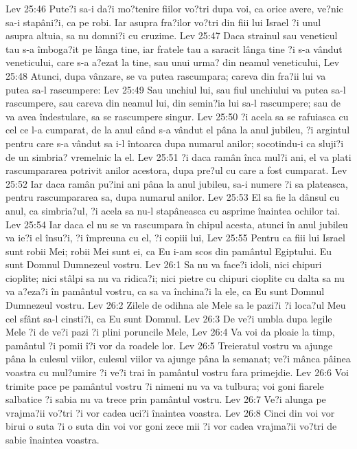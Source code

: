 Lev 25:46  Pute?i sa-i da?i mo?tenire fiilor vo?tri dupa voi, ca orice avere, ve?nic sa-i stapâni?i, ca pe robi. Iar asupra fra?ilor vo?tri din fiii lui Israel ?i unul asupra altuia, sa nu domni?i cu cruzime.
Lev 25:47  Daca strainul sau veneticul tau s-a îmboga?it pe lânga tine, iar fratele tau a saracit lânga tine ?i s-a vândut veneticului, care s-a a?ezat la tine, sau unui urma? din neamul veneticului,
Lev 25:48  Atunci, dupa vânzare, se va putea rascumpara; careva din fra?ii lui va putea sa-l rascumpere:
Lev 25:49  Sau unchiul lui, sau fiul unchiului va putea sa-l rascumpere, sau careva din neamul lui, din semin?ia lui sa-l rascumpere; sau de va avea îndestulare, sa se rascumpere singur.
Lev 25:50  ?i acela sa se rafuiasca cu cel ce l-a cumparat, de la anul când s-a vândut el pâna la anul jubileu, ?i argintul pentru care s-a vândut sa i-l întoarca dupa numarul anilor; socotindu-i ca sluji?i de un simbria? vremelnic la el.
Lev 25:51  ?i daca ramân înca mul?i ani, el va plati rascumpararea potrivit anilor acestora, dupa pre?ul cu care a fost cumparat.
Lev 25:52  Iar daca ramân pu?ini ani pâna la anul jubileu, sa-i numere ?i sa plateasca, pentru rascumpararea sa, dupa numarul anilor.
Lev 25:53  El sa fie la dânsul cu anul, ca simbria?ul, ?i acela sa nu-l stapâneasca cu asprime înaintea ochilor tai.
Lev 25:54  Iar daca el nu se va rascumpara în chipul acesta, atunci în anul jubileu va ie?i el însu?i, ?i împreuna cu el, ?i copiii lui,
Lev 25:55  Pentru ca fiii lui Israel sunt robii Mei; robii Mei sunt ei, ca Eu i-am scos din pamântul Egiptului. Eu sunt Domnul Dumnezeul vostru.
Lev 26:1  Sa nu va face?i idoli, nici chipuri cioplite; nici stâlpi sa nu va ridica?i; nici pietre cu chipuri cioplite cu dalta sa nu va a?eza?i în pamântul vostru, ca sa va închina?i la ele, ca Eu sunt Domnul Dumnezeul vostru.
Lev 26:2  Zilele de odihna ale Mele sa le pazi?i ?i loca?ul Meu cel sfânt sa-l cinsti?i, ca Eu sunt Domnul.
Lev 26:3  De ve?i umbla dupa legile Mele ?i de ve?i pazi ?i plini poruncile Mele,
Lev 26:4  Va voi da ploaie la timp, pamântul ?i pomii î?i vor da roadele lor.
Lev 26:5  Treieratul vostru va ajunge pâna la culesul viilor, culesul viilor va ajunge pâna la semanat; ve?i mânca pâinea voastra cu mul?umire ?i ve?i trai în pamântul vostru fara primejdie.
Lev 26:6  Voi trimite pace pe pamântul vostru ?i nimeni nu va va tulbura; voi goni fiarele salbatice ?i sabia nu va trece prin pamântul vostru.
Lev 26:7  Ve?i alunga pe vrajma?ii vo?tri ?i vor cadea uci?i înaintea voastra.
Lev 26:8  Cinci din voi vor birui o suta ?i o suta din voi vor goni zece mii ?i vor cadea vrajma?ii vo?tri de sabie înaintea voastra.

